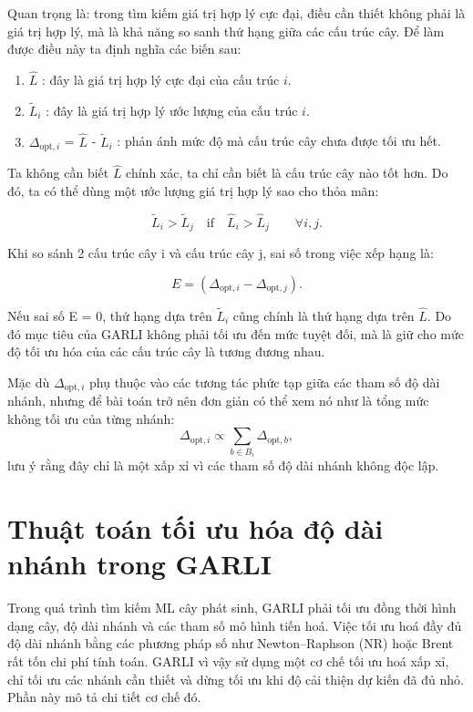 \documentclass[12pt,a4paper]{report}
\begin{document}
Quan trọng là: trong tìm kiếm giá trị hợp lý cực đại, điều cần thiết không phải là giá trị hợp lý, mà là khả năng so sanh thứ hạng giữa các cấu trúc cây. Để làm được điều này ta định nghĩa các biến sau:

\begin{enumerate}
    \item $\hat{L}$ : đây là giá trị hợp lý cực đại của cấu trúc \(i\).
    \item $\tilde{L}_i$ : đây là giá trị hợp lý ước lượng của cấu trúc \(i\).
    \item $\Delta_{\mathrm{opt},i}$ = $\hat{L}$ - $\tilde{L}_i$ : phản ánh mức độ mà cấu trúc cây chưa được tối ưu hết.
\end{enumerate}

Ta không cần biết $\hat{L}$ chính xác, ta chỉ cần biết là cấu trúc cây nào tốt hơn. Do đó, ta có thể dùng một ước lượng giá trị hợp lý sao cho thỏa mãn:

\[
\tilde{L}_i > \tilde{L}_j \quad \text{if} \quad \hat{L}_i > \hat{L}_j \qquad \forall i,j.
\]

Khi so sánh 2 cấu trúc cây i và cấu trúc cây j, sai số trong việc xếp hạng là:

\[
E = (\Delta_{\mathrm{opt},i} - \Delta_{\mathrm{opt},j}).
\]

Nếu sai số E = 0, thứ hạng dựa trên $\tilde{L}_i$ cũng chính là thứ hạng dựa trên $\hat{L}$. Do đó mục tiêu của GARLI không phải tối ưu đến mức tuyệt đối, mà là giữ cho mức độ tối ưu hóa của các cấu trúc cây là tương đương nhau.

Mặc dù $\Delta_{\mathrm{opt},i}$ phụ thuộc vào các tương tác phức tạp giữa các tham số độ dài nhánh, nhưng để bài toán trở nên đơn giản có thể xem nó như là tổng mức không tối ưu của từng nhánh:
\[
\Delta_{\mathrm{opt},i} \propto \sum_{b \in B_i} \Delta_{\mathrm{opt},b},
\]
lưu ý rằng đây chỉ là một xấp xỉ vì các tham số độ dài nhánh không độc lập.


\section{Thuật toán tối ưu hóa độ dài nhánh trong GARLI}

Trong quá trình tìm kiếm ML cây phát sinh, GARLI phải tối ưu đồng thời hình dạng cây, 
độ dài nhánh và các tham số mô hình tiến hoá. Việc tối ưu hoá đầy đủ độ dài nhánh bằng 
các phương pháp số như Newton–Raphson (NR) hoặc Brent rất tốn chi phí tính toán. 
GARLI vì vậy sử dụng một cơ chế tối ưu hoá xấp xỉ, chỉ tối ưu các nhánh cần thiết 
và dừng tối ưu khi độ cải thiện dự kiến đã đủ nhỏ. Phần này mô tả chi tiết cơ chế đó.
\end{document}
